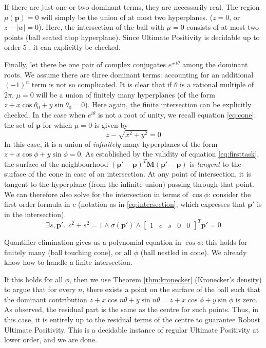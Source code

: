 If there are just one or two dominant terms, they are necessarily real. The region $\mu(\mathbf{p}) = 0$ will simply be the union of at most two hyperplanes. ($z = 0$, or $z - |w| = 0$). Here, the intersection of the ball with $\mu = 0$ consists of at most two points (ball seated atop hyperplane). Since Ultimate Positivity is decidable up to order $5$ \cite{joeljames3}, it can explicitly be checked.

Finally, let there be one pair of complex conjugates $e^{\pm i\theta}$ among the dominant roots. We assume there are three dominant terms: accounting for an additional $(-1)^n$ term is not so complicated. It is clear that if $\theta$ is a rational multiple of $2\pi$, $\mu = 0$ will be a union of finitely many hyperplanes (of the form $z + x\cos \theta_0 + y\sin \theta_0 = 0$). Here again, the finite intersection can be explicitly checked. In the case when $e^{i\theta}$ is not a root of unity, we recall equation \ref{eq:cone}: the set of $\mathbf{p}$ for which $\mu = 0$ is given by
\begin{equation}
z  - \sqrt{x^2 + y^2} = 0
\end{equation}
In this case, it is a union of \textit{infinitely} many hyperplanes of the form $z + x \cos \phi + y\sin \phi = 0$. As established by the validity of equation \ref{eq:firsttask}, the surface of the neighbourhood $(\mathbf{p'} - \mathbf{p})^T\mathbf{M}(\mathbf{p'} - \mathbf{p})$ is \textit{tangent} to the surface of the cone in case of an intersection. At any point of intersection, it is tangent to the hyperplane (from the infinite union) passing through that point. We can therefore also solve for the intersection in terms of $\cos \phi$: consider the first order formula in $c$ (notation as in \ref{eq:intersection}, which expresses that $\mathbf{p'}$ is in the intersection).
$$\exists s, \mathbf{p'}.~~c^2 + s^2 = 1 \land \sigma({\mathbf{p'}}) \land \begin{bmatrix}1 & c & s & 0 & 0 \end{bmatrix}^T\mathbf{p'} = 0 $$

Quantifier elimination gives us a polynomial equation in $\cos \phi$: this holds for finitely many (ball touching cone), or all $\phi$ (ball nestled in cone). We already know how to handle a finite intersection.

If this holds for all $\phi$, then we use Theorem \ref{thm:kronecker} (Kronecker's density) to argue that for every $n$, there exists a point on the surface of the ball such that the dominant contribution $z + x\cos n\theta + y\sin n\theta = z + x\cos\phi + y\sin\phi$ is zero. As observed, the residual part is the same as the centre for such points. Thus, in this case, it is entirely up to the residual terms of the centre to guarantee Robust Ultimate Positivity. This is a decidable instance of regular Ultimate Positivity at lower order, and we are done.
